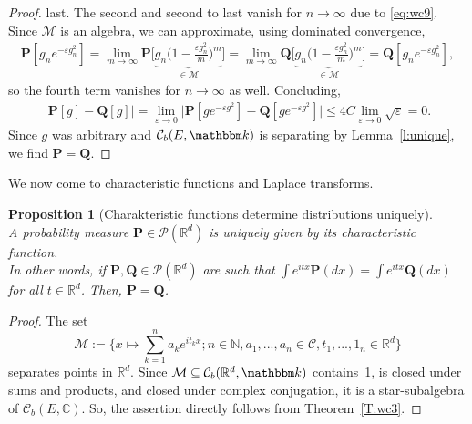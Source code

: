 \documentclass{article}
\newtheorem{proposition}{Proposition}[section]
\theoremstyle{definition}
\theoremstyle{step} \newtheorem{step}{Step}
\begin{document}
\begin{proof}
  last. The second and second to last vanish for $n\to\infty$ due to
  \eqref{eq:wc9}. Since $\mathcal M$ is an algebra, we can
  approximate, using dominated convergence,
  \begin{align*}
    \mathbf P[g_ne^{-\varepsilon g_n^2}] = \lim_{m \to \infty} \mathbf
    P[\underbrace{g_n \Big(1 - \frac{\varepsilon
            g_n^2}{m}\Big)^m}_{\in\mathcal M}\Big] = \lim_{m \to \infty}
    \mathbf Q[\underbrace{g_n \Big(1 - \frac{\varepsilon
            g_n^2}{m}\Big)^m}_{\in\mathcal M}\Big] = \mathbf
    Q[g_ne^{-\varepsilon g_n^2}],
  \end{align*}
  so the fourth term vanishes for $n\to\infty$ as well. Concluding,
  \begin{align*}
    \big|\mathbf P[g] - \mathbf Q[g] \big| = \lim_{\varepsilon\to 0}
    \big|\mathbf P[ge^{-\varepsilon g^2}] - \mathbf Q[ge^{-\varepsilon
            g^2}] \big| \leq 4C \lim_{\varepsilon \to 0}\sqrt{\varepsilon} =
    0.
  \end{align*}
  Since $g$ was arbitrary and $\mathcal C_b(E,\mathbbm k)$ is
  separating by Lemma~\ref{l:unique}, we find $\mathbf P = \mathbf Q$.
\end{proof}

\noindent
We now come to characteristic functions and Laplace transforms.

\begin{proposition}[Charakteristic functions determine distributions uniquely]
  \label{Pr:char1}\mbox{}\\
  A probability measure $\mathbf P \in\mathcal P(\mathbb R^d)$ is
  uniquely given by its characteristic function.  \\ In other words,
  if $\mathbf P, \mathbf Q \in\mathcal P(\mathbb R^d)$ are such that
  $\int e^{itx} \mathbf P(dx) = \int e^{itx} \mathbf Q(dx)$ for all
  $t\in\mathbb R^d$. Then, $\mathbf P = \mathbf Q$.
\end{proposition}

\begin{proof}
  The set
  $$\mathcal M:= \Big\{ x\mapsto \sum_{k=1}^n a_k e^{i t_k x}; n \in
    \mathbb N, a_1,...,a_n \in \mathcal C, t_1,...,1_n\in\mathbb
    R^d\Big\}$$ separates points in $\mathbb R^d$. Since $\mathcal M
    \subseteq \mathcal C_b(\mathbb R^d,\mathbbm k)$ contains~1, is
  closed under sums and products, and closed under complex
  conjugation, it is a star-subalgebra of $\mathcal C_b(E,\mathbb
    C)$. So, the assertion directly follows from Theorem~\ref{T:wc3}.
\end{proof}
\end{document}
